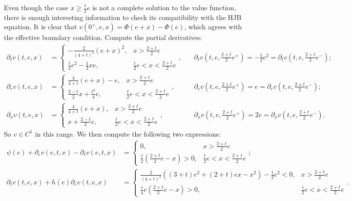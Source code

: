 \documentclass[openany,oneside]{article}
\theoremstyle{definition}
\theoremstyle{remark}
\begin{document}
{Even though the case $x\ge \frac{t}{2}e$ is not a complete solution to the value function, there is enough interesting information to check its compatibility with the HJB equation. It is clear that $v(0^+,e,x)=\Phi(e+x)-\Phi(e)$, which agrees with the effective boundary condition. Compute the partial derivatives:
\begin{align*}
\partial_t v(t,e,x) &=
\begin{cases}
-\frac{2}{(4+t)^2}(e+x)^2, & x>\frac{2+t}{2}e \\
\frac{t}{4}e^2-\frac{1}{2}xe, & \frac{t}{2}e < x < \frac{2+t}{2}e
\end{cases}, \quad
& \partial_t v \left(t,e,\frac{2+t}{2}e^+\right) = -\frac{1}{2}e^2 = \partial_t v \left(t,e,\frac{2+t}{2}e^-\right); \\
\partial_e v(t,e,x) &=
\begin{cases}
\frac{4}{4+t}(e+x)-e, & x>\frac{2+t}{2}e \\
\frac{2-t}{2}x+\frac{t^2}{4}e, & \frac{t}{2}e < x < \frac{2+t}{2}e
\end{cases}, \quad
& \partial_e v \left(t,e,\frac{2+t}{2}e^+\right) = e = \partial_e v \left(t,e,\frac{2+t}{2}e^-\right); \\
\partial_x v(t,e,x) &=
\begin{cases}
\frac{4}{4+t}(e+x), & x>\frac{2+t}{2}e \\
x+\frac{2-t}{2}e, & \frac{t}{2}e < x < \frac{2+t}{2}e
\end{cases}, \quad
& \partial_x v \left(t,e,\frac{2+t}{2}e^+\right) = 2e = \partial_x v \left(t,e,\frac{2+t}{2}e^-\right).
\end{align*}
So $v\in C^1$ in this range. We then compute the following two expressions:
\begin{align*}
\psi(e) +\partial_e v(e,t,x) -\partial_t v(e,t,x) &=
\begin{cases}
0, & x>\frac{2+t}{2}e \\
\frac{t}{2}\left(\frac{2+t}{2}e-x\right)>0, & \frac{t}{2}e < x < \frac{2+t}{2}e
\end{cases}; \\
\partial_t v(t,e,x) + h(e)\partial_e v(t,e,x) &=
\begin{cases}
\frac{2}{(4+t)^2}((3+t)e^2+(2+t)ex-x^2)-\frac{1}{2}e^2 <0, & x>\frac{2+t}{2}e \\
\frac{t}{4}e\left(\frac{2+t}{2}e-x\right) >0, & \frac{t}{2}e < x < \frac{2+t}{2}e
\end{cases}.
\end{align*}
}
\end{document}
